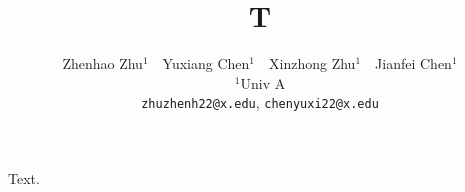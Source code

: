 \documentclass{article}
\title{T}
\author{Zhenhao Zhu$^{1}$\ \ Yuxiang Chen$^{1}$\ \ Xinzhong Zhu$^{1}$\ \ Jianfei Chen$^{1}$ \\ $^1$Univ A \\ \texttt{zhuzhenh22@x.edu}, \texttt{chenyuxi22@x.edu}}
\begin{document}
\maketitle
Text.
\end{document}
